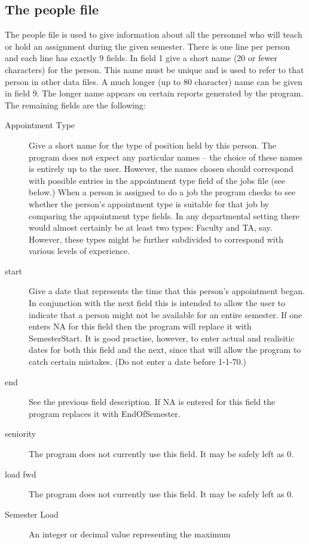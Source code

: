 \subsection{The people file}

The people file is used to give information about all the personnel who will
teach or hold an assignment during the given semester. There is one line
per person and each line has exactly 9 fields. In field 1 give a short name
(20 or fewer characters) for the person. This name must be unique
and is used to refer to that person in other data files. A much longer
(up to 80 character) name can be given in field 9. The longer name appears on
certain reports generated by the program. The remaining fields are
the following:
\begin{description}
\item [Appointment Type] Give a short name for the type of position held by
this person. The program does not expect any particular names -- the choice
of these names is entirely up to the user. However, the names chosen should
correspond with possible entries in the appointment type field of the jobs
file (see below.) When a person is assigned to do a job the program checks
to see whether the person's appointment type is suitable for that job by
comparing the appointment type fields. In any departmental setting there
would almost certainly be at least two types: Faculty and TA, say. However,
these types might be further subdivided to correspond with various levels of
experience.
\item [start] Give a date that represents the time that this person's appointment began. In conjunction with the next field this is intended to allow the
user to indicate that a person might not be available for an entire semester.
If one enters NA for this field then the program will replace it with
SemesterStart. It is good practise, however, to enter actual and realisitic
dates for both this field and the next, since that will allow the program 
to catch certain mistakes. (Do not enter a date before 1-1-70.)
\item [end] See the previous field description. If NA is entered for this
field the program replaces it with EndOfSemester.
\item [seniority] The program does not currently use this field. It may be
safely left as 0.
\item [load fwd] The program does not currently use this field. It may be
safely left as 0.
\item [Semester Load] An integer or decimal value representing the maximum

\end{description}
